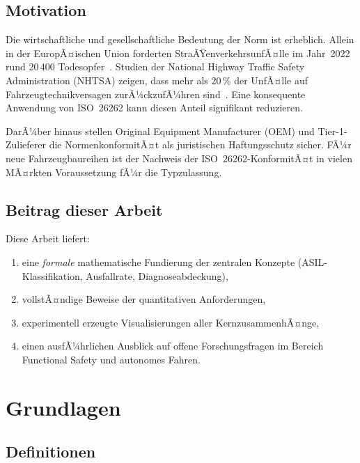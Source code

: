 ﻿\documentclass[a4paper,12pt]{article}
\theoremstyle{definition}
\begin{document}
\subsection{Motivation}

Die wirtschaftliche und gesellschaftliche Bedeutung der Norm ist erheblich.
Allein in der EuropÃ¤ischen Union forderten StraÃŸenverkehrsunfÃ¤lle im
Jahr~2022 rund 20\,400 Todesopfer~\cite{eu_road_safety_2023}. Studien der
National Highway Traffic Safety Administration (NHTSA) zeigen, dass mehr
als 20\,\% der UnfÃ¤lle auf Fahrzeugtechnikversagen zurÃ¼ckzufÃ¼hren
sind~\cite{nhtsa_2022}. Eine konsequente Anwendung von ISO~26262 kann
diesen Anteil signifikant reduzieren.

DarÃ¼ber hinaus stellen Original Equipment Manufacturer (OEM) und
Tier-1-Zulieferer die NormenkonformitÃ¤t als juristischen Haftungsschutz
sicher. FÃ¼r neue Fahrzeugbaureihen ist der Nachweis der
ISO~26262-KonformitÃ¤t in vielen MÃ¤rkten Voraussetzung fÃ¼r die Typzulassung.

\subsection{Beitrag dieser Arbeit}

Diese Arbeit liefert:
\begin{enumerate}
  \item eine \emph{formale} mathematische Fundierung der zentralen Konzepte
        (ASIL-Klassifikation, Ausfallrate, Diagnoseabdeckung),
  \item vollstÃ¤ndige Beweise der quantitativen Anforderungen,
  \item experimentell erzeugte Visualisierungen aller KernzusammenhÃ¤nge,
  \item einen ausfÃ¼hrlichen Ausblick auf offene Forschungsfragen im Bereich
        Functional Safety und autonomes Fahren.
\end{enumerate}

\section{Grundlagen}

\subsection{Definitionen}
\end{document}
